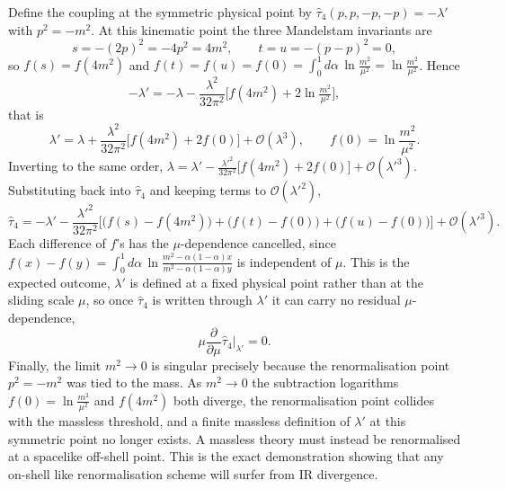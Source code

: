 \begin{solution}
 
Define the coupling at the symmetric physical point by $\hat\tau_4(p,p,-p,-p) = -\lambda'$ with $p^2 = -m^2$. At this kinematic point the three Mandelstam invariants are
\begin{equation}
    s = -(2p)^2 = -4p^2 = 4m^2, \qquad t = u = -(p - p)^2 = 0,
\end{equation}
so $f(s) = f(4m^2)$ and $f(t) = f(u) = f(0) = \int_0^1 d\alpha\,\ln\frac{m^2}{\mu^2} = \ln\frac{m^2}{\mu^2}$. Hence
\begin{equation}
    -\lambda' = -\lambda - \frac{\lambda^2}{32\pi^2}\big[f(4m^2) + 2\ln\tfrac{m^2}{\mu^2}\big],
\end{equation}
that is
\begin{equation}
    \lambda' = \lambda + \frac{\lambda^2}{32\pi^2}\big[f(4m^2) + 2f(0)\big] + \mathcal{O}(\lambda^3),
    \qquad f(0) = \ln\frac{m^2}{\mu^2}.
\end{equation}
Inverting to the same order, $\lambda = \lambda' - \frac{\lambda'^2}{32\pi^2}\big[f(4m^2) + 2f(0)\big] + \mathcal{O}(\lambda'^3)$. Substituting back into $\hat\tau_4$ and keeping terms to $\mathcal{O}(\lambda'^2)$,
\begin{equation}
    \hat\tau_4 = -\lambda' - \frac{\lambda'^2}{32\pi^2}\Big[\big(f(s) - f(4m^2)\big) + \big(f(t) - f(0)\big) + \big(f(u) - f(0)\big)\Big] + \mathcal{O}(\lambda'^3).
\end{equation}
Each difference of $f$'s has the $\mu$-dependence cancelled, since $f(x) - f(y) = \int_0^1 d\alpha\,\ln\frac{m^2 - \alpha(1-\alpha)x}{m^2 - \alpha(1-\alpha)y}$ is independent of $\mu$. This is the expected outcome, $\lambda'$ is defined at a fixed physical point rather than at the sliding scale $\mu$, so once $\hat\tau_4$ is written through $\lambda'$ it can carry no residual $\mu$-dependence,
\begin{equation}
    \mu\frac{\partial}{\partial\mu}\hat\tau_4\Big|_{\lambda'} = 0.
\end{equation}
Finally, the limit $m^2 \to 0$ is singular precisely because the renormalisation point $p^2 = -m^2$ was tied to the mass. As $m^2 \to 0$ the subtraction logarithms $f(0) = \ln\frac{m^2}{\mu^2}$ and $f(4m^2)$ both diverge, the renormalisation point collides with the massless threshold, and a finite massless definition of $\lambda'$ at this symmetric point no longer exists. A massless theory must instead be renormalised at a spacelike off-shell point. This is the exact demonstration showing that any on-shell like renormalisation scheme will surfer from IR divergence.
 
\end{solution}


